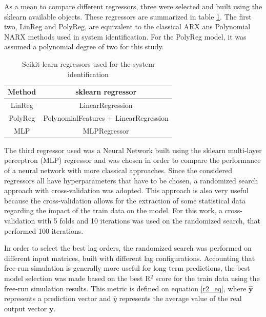 \documentclass[conference]{IEEEtran}
\begin{document}
As a mean to compare different regressors, three were selected and built using the sklearn available objects. These regressors are summarized in table \ref{regressors}. The  first two, LinReg and PolyReg, are equivalent to the classical ARX ans Polynomial NARX methods used in system identification. For the PolyReg model, it was assumed a polynomial degree of two for this study.

\begin{table}[htbp]
\caption{Scikit-learn regressors used for the system identification}
\begin{center}
\begin{tabular}{|c|c|}
\hline
\textbf{Method}&{\textbf{sklearn regressor}} \\
\hline
LinReg & LinearRegression  \\
\hline
PolyReg & PolynomialFeatures + LinearRegression   \\
\hline
MLP & MLPRegressor  \\
\hline
\end{tabular}
\label{regressors}
\end{center}
\end{table}

The third regressor used was a Neural Network built using the sklearn multi-layer perceptron (MLP) regressor and was chosen in order to compare the performance of a neural network with more classical approaches. Since the considered regressors all have hyperparameters that have to be chosen, a randomized search approach with cross-validation was adopted. This approach is also very useful because the cross-validation allows for the extraction of some statistical data regarding the impact of the train data on the model. For this work, a cross-validation with 5 folds and 10 iterations was used on the randomized search, that performed 100 iterations. 

In order to select the best lag orders, the randomized search was performed on different input matrices, built with different lag configurations. Accounting that free-run simulation is generally more useful for long term predictions, the best model selection was made based on the best R$^2$ score for the train data using the free-run simulation results. This metric is defined on equation \ref{r2_eq}, where $\mathbf{\hat{y}}$ represents a prediction vector and $\bar{y}$ represents the average value of the real output vector $\mathbf{y}$.

\end{document}
